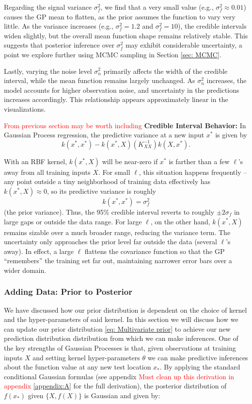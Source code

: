 \documentclass{article}
\begin{document}
\noindent
Regarding the signal variance $\sigma_f^2$, we find that a very small value (e.g., $\sigma_f^2 \approx 0.01$) causes the GP mean to flatten,
as the prior assumes the function to vary very little. As the variance increases (e.g., $\sigma_f^2 = 1.2$ and $\sigma_f^2 = 10$), the credible intervals widen slightly,
but the overall mean function shape remains relatively stable. This suggests that posterior inference over $\sigma_f^2$ may exhibit considerable uncertainty, a point we explore further using MCMC sampling in Section \ref{sec: MCMC}.


\noindent
Lastly, varying the noise level $\sigma_n^2$ primarily affects the width of the credible interval, 
while the mean function remains largely unchanged. As $\sigma_n^2$ increases, the model accounts for higher observation noise, 
and uncertainty in the predictions increases accordingly. This relationship appears approximately linear in the visualizations.


\textcolor{red}{From previous section may be worth including}
\textbf{Credible Interval Behavior:} In Gaussian Process regression, the predictive variance at a new input $x^*$ is given by
\[
k(x^*, x^*) - k(x^*, X)(K_{XX}^{-1})k(X, x^*).
\]

With an RBF kernel, $k(x^*, X)$ will be near-zero if $x^*$ is farther than a few $\ell$'s away from all training inputs $X$. 
For small $\ell$, this situation happens frequently – any point outside a tiny neighborhood of training data effectively has $k(x^*, X) 
\approx 0$, so its predictive variance is roughly
\[
k(x^*, x^*) = \sigma_f^2
\]
(the prior variance). Thus, the 95\% credible interval reverts to roughly $\pm 2\sigma_f$ in large gaps or outside the data range.
For large $\ell$, on the other hand, $k(x^*, X)$ remains sizable over a much broader range, reducing the variance term. The uncertainty
only approaches the prior level far outside the data (several $\ell$'s away). In effect, a large $\ell$ flattens the covariance function
so that the GP “remembers” the training set far out, maintaining narrower error bars over a wider domain.



\subsubsection*{Adding Data: Prior to Posterior}
\label{sec: priortoposterior}

We have discussed how our prior distribution is dependent on the choice of kernel and the hyper-parameters of said kernel. In this section
we will discuss how we can update our prior distribution \ref{eq: Multivariate prior} to achieve our new prediction distribution distribution from which we can make
inferences. One of the key strengths of Gaussian Processes is that, given observations at training inputs \(X\) and setting kernel hyper-parameters \(\theta\)
we can make predictive inferences about the function value at any new test location \(x_*\).
By applying the standard conditional Gaussian formulas (see appendix \textcolor{red}{Must clean up this derivation in appendix} \ref{appendix:A} for the full derivation),
the posterior distribution of \(f(x_*)\) given \(\{X, f(X)\}\) is Gaussian and given by:
\end{document}
